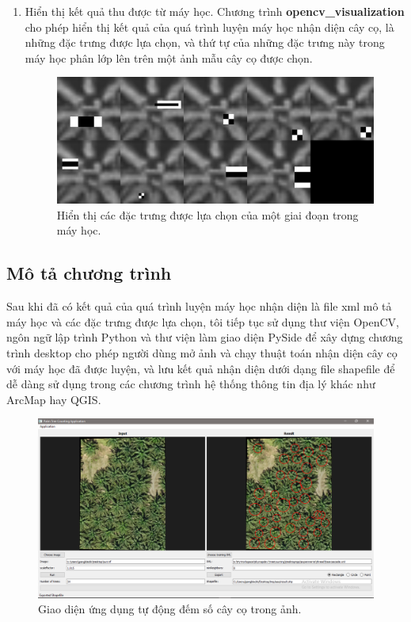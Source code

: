 \documentclass[14pt, oneside, a4paper, openany]{scrartcl}
\begin{document}
\begin{enumerate}
	\item Hiển thị kết quả thu được từ máy học. Chương trình \textbf{opencv\_visualization} cho phép hiển thị kết quả của quá trình luyện máy học nhận diện cây cọ, là những đặc trưng được lựa chọn, và thứ tự của những đặc trưng này trong máy học phân lớp lên trên một ảnh mẫu cây cọ được chọn.
\begin{figure}[!h]
	\centering
	\includegraphics[scale=0.3]{figures/datastage_11.png} 
	\caption[Hiển thị các đặc trưng được lựa chọn của một giai đoạn trong máy học]{Hiển thị các đặc trưng được lựa chọn của một giai đoạn trong máy học.}
\end{figure}	
\end{enumerate}

\subsection{Mô tả chương trình}
Sau khi đã có kết quả của quá trình luyện máy học nhận diện là file xml mô tả máy học và các đặc trưng được lựa chọn, tôi tiếp tục sử dụng thư viện OpenCV, ngôn ngữ lập trình Python và thư viện làm giao diện PySide để xây dựng chương trình desktop cho phép người dùng mở ảnh và chạy thuật toán nhận diện cây cọ với máy học đã được luyện, và lưu kết quả nhận diện dưới dạng file shapefile để dễ dàng sử dụng trong các chương trình hệ thống thông tin địa lý khác như ArcMap hay QGIS.

\begin{figure}[!h]
	\centering
	\includegraphics[scale=0.45]{figures/appScreenshot01.png}
	\caption[Giao diện ứng dụng tự động đếm số cây cọ trong ảnh]{Giao diện ứng dụng tự động đếm số cây cọ trong ảnh.}
\end{figure}
\end{document}
